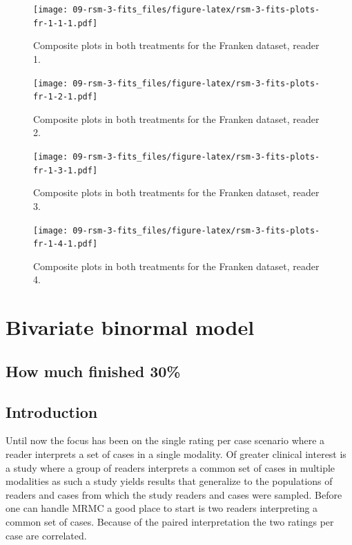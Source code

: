 \documentclass[
]{book}
\begin{document}
\begin{figure}
\centering
\texttt{[image: 09-rsm-3-fits\_files/figure-latex/rsm-3-fits-plots-fr-1-1-1.pdf]}
\caption{\label{fig:rsm-3-fits-plots-fr-1-1}Composite plots in both treatments for the Franken dataset, reader 1.}
\end{figure}

\begin{figure}
\centering
\texttt{[image: 09-rsm-3-fits\_files/figure-latex/rsm-3-fits-plots-fr-1-2-1.pdf]}
\caption{\label{fig:rsm-3-fits-plots-fr-1-2}Composite plots in both treatments for the Franken dataset, reader 2.}
\end{figure}

\begin{figure}
\centering
\texttt{[image: 09-rsm-3-fits\_files/figure-latex/rsm-3-fits-plots-fr-1-3-1.pdf]}
\caption{\label{fig:rsm-3-fits-plots-fr-1-3}Composite plots in both treatments for the Franken dataset, reader 3.}
\end{figure}

\begin{figure}
\centering
\texttt{[image: 09-rsm-3-fits\_files/figure-latex/rsm-3-fits-plots-fr-1-4-1.pdf]}
\caption{\label{fig:rsm-3-fits-plots-fr-1-4}Composite plots in both treatments for the Franken dataset, reader 4.}
\end{figure}

\hypertarget{bivariate-binormal-model}{%
\chapter{Bivariate binormal model}\label{bivariate-binormal-model}}

\hypertarget{bivariate-binormal-model-how-much-finished}{%
\section{How much finished 30\%}\label{bivariate-binormal-model-how-much-finished}}

\hypertarget{bivariate-binormal-model-introduction}{%
\section{Introduction}\label{bivariate-binormal-model-introduction}}

Until now the focus has been on the single rating per case scenario where a reader interprets a set of cases in a single modality. Of greater clinical interest is a study where a group of readers interprets a common set of cases in multiple modalities as such a study yields results that generalize to the populations of readers and cases from which the study readers and cases were sampled. Before one can handle MRMC a good place to start is two readers interpreting a common set of cases. Because of the paired interpretation the two ratings per case are correlated.
\end{document}
